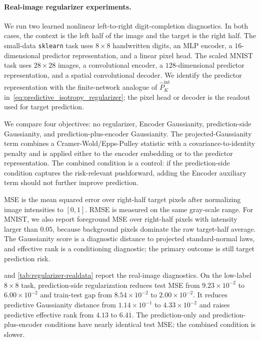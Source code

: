 \paragraph{Real-image regularizer experiments.}
We run two learned nonlinear left-to-right digit-completion diagnostics. In
both cases, the context is the left half of the image and the target is the
right half. The small-data \texttt{sklearn} task uses $8\times8$ handwritten
digits, an MLP encoder, a $16$-dimensional predictor representation, and a
linear pixel head. The scaled MNIST task uses $28\times28$ images, a
convolutional encoder, a $128$-dimensional predictor representation, and a
spatial convolutional decoder. We identify the predictor representation with
the finite-network analogue of $\widehat P_K^{\mathrm{int}}$
in~\eqref{eq:predictive_isotropy_regularizer}; the pixel head or decoder is the
readout used for target prediction.

We compare four objectives: no regularizer, Encoder Gaussianity,
prediction-side Gaussianity, and prediction-plus-encoder Gaussianity. The
projected-Gaussianity term combines a Cramer-Wold/Epps-Pulley statistic with a
covariance-to-identity penalty and is applied either to the encoder embedding or
to the predictor representation. The combined condition is a control: if the
prediction-side condition captures the risk-relevant pushforward, adding the
Encoder auxiliary term should not further improve prediction.

MSE is the mean squared error over right-half target pixels after normalizing
image intensities to $[0,1]$. RMSE is measured on the
same gray-scale range. For MNIST, we also report foreground MSE over
right-half pixels with intensity larger than $0.05$, because background pixels
dominate the raw target-half average. The Gaussianity score is a diagnostic
distance to projected standard-normal laws, and effective rank is a conditioning
diagnostic; the primary outcome is still target prediction risk.

 and
\cref{tab:regularizer-realdata} report the real-image diagnostics. On the
low-label $8\times8$ task, prediction-side regularization reduces test MSE from
$9.23{\times}10^{-2}$ to $6.00{\times}10^{-2}$ and train-test gap from
$8.54{\times}10^{-2}$ to $2.00{\times}10^{-2}$. It reduces predictive
Gaussianity distance from $1.14{\times}10^{-1}$ to $4.33{\times}10^{-2}$ and
raises predictive effective rank from $4.13$ to $6.41$. The prediction-only and
prediction-plus-encoder conditions have nearly identical test MSE; the combined
condition is slower.

